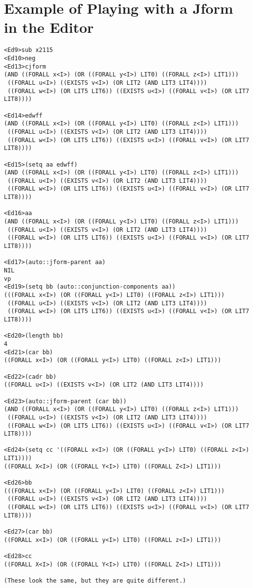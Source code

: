 \section{Example of Playing with a Jform in the Editor}

\begin{verbatim}
<Ed9>sub x2115
<Ed10>neg
<Ed13>cjform
(AND ((FORALL x<I>) (OR ((FORALL y<I>) LIT0) ((FORALL z<I>) LIT1))) 
 ((FORALL u<I>) ((EXISTS v<I>) (OR LIT2 (AND LIT3 LIT4)))) 
 ((FORALL w<I>) (OR LIT5 LIT6)) ((EXISTS u<I>) ((FORALL v<I>) (OR LIT7 LIT8))))

<Ed14>edwff
(AND ((FORALL x<I>) (OR ((FORALL y<I>) LIT0) ((FORALL z<I>) LIT1))) 
 ((FORALL u<I>) ((EXISTS v<I>) (OR LIT2 (AND LIT3 LIT4))))
 ((FORALL w<I>) (OR LIT5 LIT6)) ((EXISTS u<I>) ((FORALL v<I>) (OR LIT7 LIT8))))

<Ed15>(setq aa edwff)
(AND ((FORALL x<I>) (OR ((FORALL y<I>) LIT0) ((FORALL z<I>) LIT1))) 
 ((FORALL u<I>) ((EXISTS v<I>) (OR LIT2 (AND LIT3 LIT4))))
 ((FORALL w<I>) (OR LIT5 LIT6)) ((EXISTS u<I>) ((FORALL v<I>) (OR LIT7 LIT8))))

<Ed16>aa
(AND ((FORALL x<I>) (OR ((FORALL y<I>) LIT0) ((FORALL z<I>) LIT1)))
 ((FORALL u<I>) ((EXISTS v<I>) (OR LIT2 (AND LIT3 LIT4))))
 ((FORALL w<I>) (OR LIT5 LIT6)) ((EXISTS u<I>) ((FORALL v<I>) (OR LIT7 LIT8))))

<Ed17>(auto::jform-parent aa)
NIL
vp
<Ed19>(setq bb (auto::conjunction-components aa))
(((FORALL x<I>) (OR ((FORALL y<I>) LIT0) ((FORALL z<I>) LIT1)))
 ((FORALL u<I>) ((EXISTS v<I>) (OR LIT2 (AND LIT3 LIT4))))
 ((FORALL w<I>) (OR LIT5 LIT6)) ((EXISTS u<I>) ((FORALL v<I>) (OR LIT7 LIT8))))

<Ed20>(length bb)
4
<Ed21>(car bb)
((FORALL x<I>) (OR ((FORALL y<I>) LIT0) ((FORALL z<I>) LIT1)))

<Ed22>(cadr bb)
((FORALL u<I>) ((EXISTS v<I>) (OR LIT2 (AND LIT3 LIT4))))

<Ed23>(auto::jform-parent (car bb))
(AND ((FORALL x<I>) (OR ((FORALL y<I>) LIT0) ((FORALL z<I>) LIT1))) 
 ((FORALL u<I>) ((EXISTS v<I>) (OR LIT2 (AND LIT3 LIT4)))) 
 ((FORALL w<I>) (OR LIT5 LIT6)) ((EXISTS u<I>) ((FORALL v<I>) (OR LIT7 LIT8))))

<Ed24>(setq cc '((FORALL x<I>) (OR ((FORALL y<I>) LIT0) ((FORALL z<I>) LIT1))))
((FORALL X<I>) (OR ((FORALL Y<I>) LIT0) ((FORALL Z<I>) LIT1)))

<Ed26>bb
(((FORALL x<I>) (OR ((FORALL y<I>) LIT0) ((FORALL z<I>) LIT1)))
 ((FORALL u<I>) ((EXISTS v<I>) (OR LIT2 (AND LIT3 LIT4))))
 ((FORALL w<I>) (OR LIT5 LIT6)) ((EXISTS u<I>) ((FORALL v<I>) (OR LIT7 LIT8))))

<Ed27>(car bb)
((FORALL x<I>) (OR ((FORALL y<I>) LIT0) ((FORALL z<I>) LIT1)))

<Ed28>cc
((FORALL X<I>) (OR ((FORALL Y<I>) LIT0) ((FORALL Z<I>) LIT1)))

(These look the same, but they are quite different.)
\end{verbatim}

